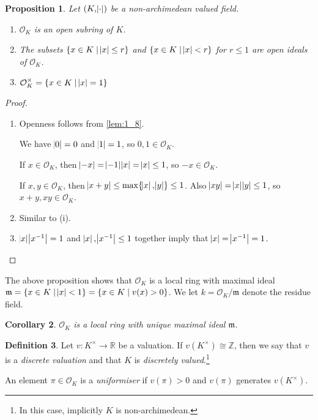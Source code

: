 \documentclass[11pt]{article}
\theoremstyle{definition}
\newtheorem{definition}{Definition}[subsection]
\theoremstyle{plain}
\newtheorem{proposition}[definition]{Proposition}
\newtheorem{corollary}[definition]{Corollary}
\theoremstyle{remark}
\newcommand{\bZ}{\mathbb{Z}}
\newcommand{\bR}{\mathbb{R}}
\newcommand{\cO}{\mathcal{O}}
\newcommand{\fm}{\mathfrak{m}}
\begin{document}
\begin{proposition}\label{prop:2_3}
    Let $(K, \abs{\cdot})$ be a non-archimedean valued field.
    \begin{enumerate}
        \item $\cO_K$ is an open subring of $K$.
        \item The subsets $\{x \in K \mid \abs{x} \le r\}$ and $\{x \in K \mid \abs{x} < r\}$ for $r \le 1$ are open ideals of $\cO_K$.
        \item $\cO_K^\times = \{x \in K \mid \abs{x} = 1\}$
    \end{enumerate}
\end{proposition}
\begin{proof}\phantom{}
    \begin{enumerate}
        \item Openness follows from \autoref{lem:1_8}.

            \noindent We have $\abs{0} = 0$ and $\abs{1} = 1$, so $0, 1 \in \cO_K$.

            \noindent If $x \in \cO_K$, then $\abs{-x} = \abs{-1}\abs{x} = \abs{x} \le 1$, so $-x \in \cO_K$.

            \noindent If $x, y \in \cO_K$, then $\abs{x + y} \le \max \{\abs{x}, \abs{y}\} \le 1$. Also $\abs{x y} = \abs{x} \abs{y} \le 1$, so $x + y, x y \in \cO_K$.

        \item Similar to (i).

        \item $\abs{x} \abs{x^{-1}} = 1$ and $\abs{x}, \abs{x^{-1}} \le 1$ together imply that $\abs{x} = \abs{x^{-1}} = 1$. \qedhere
    \end{enumerate}
\end{proof}

\noindent The above proposition shows that $\cO_K$ is a local ring with maximal ideal $\fm = \{x \in K \mid \abs{x} < 1\} = \{x \in K \mid v(x) > 0\}$. We let $k = \cO_K / \fm$ denote the residue field.

\begin{corollary}\label{cor:2_4}
    $\cO_K$ is a local ring with unique maximal ideal $\fm$.
\end{corollary}

\begin{definition}
    Let $v : K^\times \to \bR$ be a valuation. If $v(K^\times) \cong \bZ$, then we say that $v$ is a \emph{discrete valuation} and that $K$ is \emph{discretely valued}.\footnote{In this case, implicitly $K$ is non-archimedean.}

    An element $\pi \in \cO_K$ is a \emph{uniformiser} if $v(\pi) > 0$ and $v(\pi)$ generates $v(K^\times)$.
\end{definition}
\end{document}
